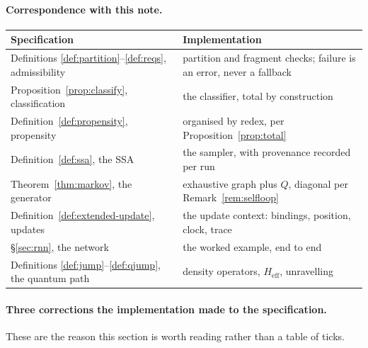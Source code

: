 \documentclass[11pt,a4paper]{article}
\theoremstyle{plain}
\theoremstyle{definition}
\theoremstyle{remark}
\newcommand{\Heff}{H_{\mathrm{eff}}}
\begin{document}
\paragraph{Correspondence with this note.}
\begin{center}
\begin{tabular}{@{}ll@{}}
\toprule
Specification & Implementation \\
\midrule
Definitions \ref{def:partition}--\ref{def:reqs}, admissibility & partition and fragment checks; failure is an error, never a fallback \\
Proposition~\ref{prop:classify}, classification & the classifier, total by construction \\
Definition~\ref{def:propensity}, propensity & organised by redex, per Proposition~\ref{prop:total} \\
Definition~\ref{def:ssa}, the SSA & the sampler, with provenance recorded per run \\
Theorem~\ref{thm:markov}, the generator & exhaustive graph plus $Q$, diagonal per Remark~\ref{rem:selfloop} \\
Definition~\ref{def:extended-update}, updates & the update context: bindings, position, clock, trace \\
\S\ref{sec:rnn}, the network & the worked example, end to end \\
Definitions \ref{def:jump}--\ref{def:qjump}, the quantum path & density operators, $\Heff$, unravelling \\
\bottomrule
\end{tabular}
\end{center}

\paragraph{Three corrections the implementation made to the specification.} These are the reason this
section is worth reading rather than a table of ticks.
\end{document}
